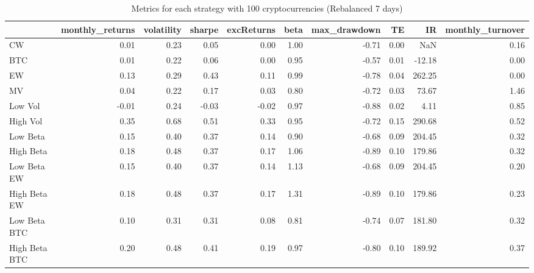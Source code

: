 \begin{table}
\centering
\caption{Metrics for each strategy with 100 cryptocurrencies (Rebalanced 7 days)}
\label{metrics100_7}
\begin{tabular}{lrrrrrrrrr}
\toprule
{} &  monthly\_returns &  volatility &  sharpe &  excReturns &  beta &  max\_drawdown &   TE &     IR &  monthly\_turnover \\
\midrule
CW            &             0.01 &        0.23 &    0.05 &        0.00 &  1.00 &         -0.71 & 0.00 &    NaN &              0.16 \\
BTC           &             0.01 &        0.22 &    0.06 &        0.00 &  0.95 &         -0.57 & 0.01 & -12.18 &              0.00 \\
EW            &             0.13 &        0.29 &    0.43 &        0.11 &  0.99 &         -0.78 & 0.04 & 262.25 &              0.00 \\
MV            &             0.04 &        0.22 &    0.17 &        0.03 &  0.80 &         -0.72 & 0.03 &  73.67 &              1.46 \\
Low Vol       &            -0.01 &        0.24 &   -0.03 &       -0.02 &  0.97 &         -0.88 & 0.02 &   4.11 &              0.85 \\
High Vol      &             0.35 &        0.68 &    0.51 &        0.33 &  0.95 &         -0.72 & 0.15 & 290.68 &              0.52 \\
Low Beta      &             0.15 &        0.40 &    0.37 &        0.14 &  0.90 &         -0.68 & 0.09 & 204.45 &              0.32 \\
High Beta     &             0.18 &        0.48 &    0.37 &        0.17 &  1.06 &         -0.89 & 0.10 & 179.86 &              0.32 \\
Low Beta EW   &             0.15 &        0.40 &    0.37 &        0.14 &  1.13 &         -0.68 & 0.09 & 204.45 &              0.20 \\
High Beta EW  &             0.18 &        0.48 &    0.37 &        0.17 &  1.31 &         -0.89 & 0.10 & 179.86 &              0.23 \\
Low Beta BTC  &             0.10 &        0.31 &    0.31 &        0.08 &  0.81 &         -0.74 & 0.07 & 181.80 &              0.32 \\
High Beta BTC &             0.20 &        0.48 &    0.41 &        0.19 &  0.97 &         -0.80 & 0.10 & 189.92 &              0.37 \\
\bottomrule
\end{tabular}
\end{table}
